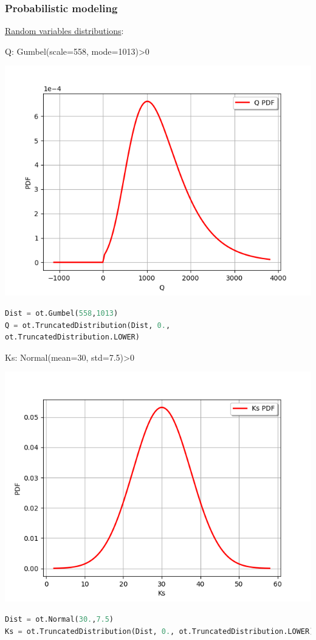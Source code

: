 \documentclass[aspectratio=169]{beamer}
\begin{document}
\begin{frame}[containsverbatim]
\frametitle{Probabilistic modeling}

\scriptsize

\underline{Random variables distributions}: 

\tiny 


\begin{minipage}[t]{0.5\textwidth}

Q: Gumbel(scale=558, mode=1013)>0

    \includegraphics[width=.45\textwidth]{figures/Q.png}
    
\tiny
\begin{lstlisting}[language=Python]
Dist = ot.Gumbel(558,1013)
Q = ot.TruncatedDistribution(Dist, 0.,
ot.TruncatedDistribution.LOWER)
\end{lstlisting}

\end{minipage}%
\begin{minipage}[t]{0.5\textwidth}

Ks: Normal(mean=30, std=7.5)>0

    \includegraphics[width=.45\textwidth]{figures/Ks.png}
    
    \tiny
\begin{lstlisting}[language=Python]
Dist = ot.Normal(30.,7.5)
Ks = ot.TruncatedDistribution(Dist, 0., ot.TruncatedDistribution.LOWER)

\end{lstlisting}

\end{minipage}
\begin{minipage}[t]{0.5\textwidth}


\end{minipage}
\end{frame}
\end{document}
